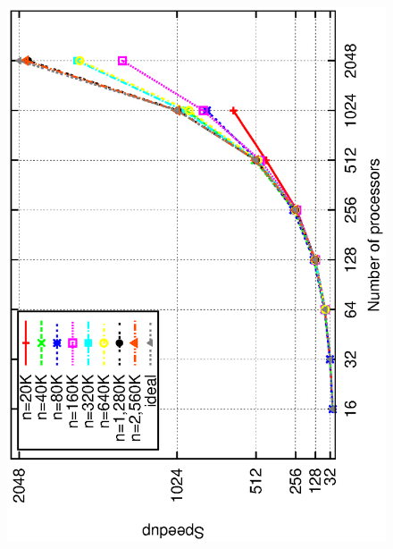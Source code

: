 \documentclass[10pt,journal,letterpaper,compsoc]{IEEEtran}
\begin{document}
\begin{figure}[t]
\centerline{
						\includegraphics[angle=-90, scale=0.5]{speedup.eps}
            \hspace*{0.2in}
}
\end{figure}
\end{document}
